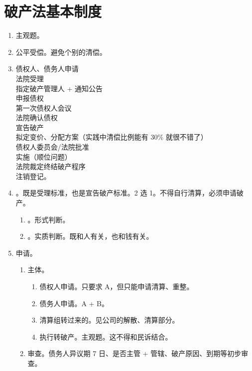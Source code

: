 \section{破产法基本制度}
\begin{enumerate}
  \item 主观题。
  \item 公平受偿。避免个别的清偿。
  \item 债权人、债务人申请 \\\yjt
        法院受理 \\\yjt
        指定破产管理人 + 通知公告 \\\yjt
        申报债权 \\\yjt
        第一次债权人会议 \\\yjt
        法院确认债权 \\\yjt
        宣告破产 \\\yjt
        拟定变价、分配方案（实践中清偿比例能有 30\% 就很不错了） \\\yjt
        债权人委员会/法院批准 \\\yjt
        实施（顺位问题） \\\yjt
        法院裁定终结破产程序 \\\yjt
        注销登记。
  \item {}。既是受理标准，也是宣告破产标准。2 选 1。不得自行清算，必须申请破产。
        \begin{enumerate}
          \item {}。形式判断。
          \item {}。实质判断。既和人有关，也和钱有关。
        \end{enumerate}
  \item 申请。
        \begin{enumerate}
          \item 主体。
                \begin{enumerate}
                  \item 债权人申请。只要求 A，但只能申请清算、重整。
                  \item 债务人申请。A + B。
                  \item 清算组转过来的。见公司的解散、清算部分。
                  \item 执行转破产。主观题。这不得和民诉结合。
                \end{enumerate}
          \item 审查。债务人异议期 7 日、是否主管 + 管辖、破产原因、到期等初步审查。

\end{enumerate}
\end{enumerate}

